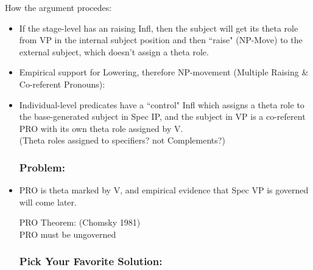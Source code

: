 \documentclass[landscape]{article}
\begin{document}
How the argument procedes:
\begin{itemize}
\item If the stage-level has an raising Infl, then the subject will get its theta role from VP in the internal subject position and then ``raise" (NP-Move) to the external subject, which doesn't assign a theta role. 
\item Empirical support for Lowering, therefore NP-movement (Multiple Raising \& Co-referent Pronouns): 

\item Individual-level predicates have a ``control" Infl which assigns a theta role to the base-generated subject in Spec IP, and the subject in VP is a co-referent PRO with its own theta role assigned by V.\\
(Theta roles assigned to specifiers? not Complements?)


\subsubsection*{Problem:}
\item PRO is theta marked by V, and empirical evidence that Spec VP is governed will come later.
\begin{example}PRO Theorem:  (Chomsky 1981)\\
PRO must be ungoverned\\
\end{example}

\subsubsection*{Pick Your Favorite Solution:}


\end{itemize}
\end{document}
